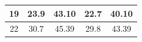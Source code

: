 \documentclass{article}
\begin{document}
\begin{Large}
\begin{table}[h]
\begin{tabular}{|c|cc|cc|}
19                                                                       & \multicolumn{1}{c|}{23.9}                                                    & 43.10                                                       & \multicolumn{1}{c|}{22.7}                                                    & 40.10                                                       \\ \hline
22                                                                       & \multicolumn{1}{c|}{30.7}                                                    & 45.39                                                       & \multicolumn{1}{c|}{29.8}                                                    & 43.39                                                       \\ \hline
\end{tabular}
\end{table}





\end{Large}
\end{document}

